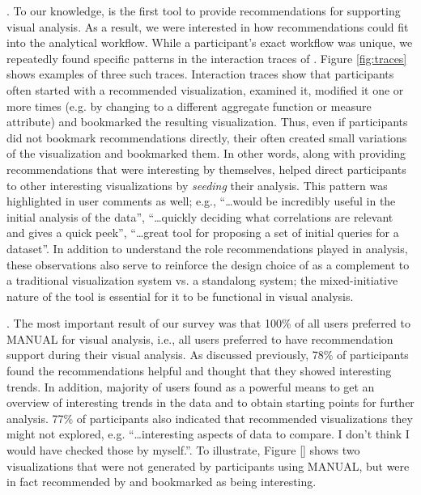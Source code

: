 . 
To our knowledge, \SeeDB is the first tool to provide recommendations for supporting visual
analysis.
As a result, we were interested in how recommendations could fit into the analytical workflow.
While a participant's exact workflow was unique, we repeatedly found specific patterns in the
interaction traces of \SeeDB.
Figure \ref{fig:traces} shows examples of three such traces.
Interaction traces show that participants often started with a recommended visualization, 
examined it, modified it one or more times (e.g. by changing to a different aggregate function 
or measure attribute) and bookmarked the resulting visualization.
Thus, even if participants did not bookmark recommendations directly, their often created
small variations of the visualization and bookmarked them.
In other words, along with providing recommendations that were interesting by themselves, \SeeDB
helped direct participants to other interesting visualizations by {\em seeding} their analysis.
This pattern was highlighted in user comments as well; e.g.,
``\ldots would be incredibly useful in the initial analysis of the data'', 
``\ldots quickly deciding what correlations are relevant and gives a quick peek'',
``\ldots great tool for proposing a set of initial queries for a dataset''.
In addition to understand the role recommendations played in analysis, these observations 
also serve to reinforce the design choice of \SeeDB as a complement to a traditional
visualization system vs. a standalong system; the mixed-initiative nature of the tool 
is essential for it to be functional in visual analysis.

. 
The most important result of our survey was that 100\% of all users preferred \SeeDB to MANUAL for
visual analysis, i.e., all users preferred to have recommendation support during their visual analysis.
As discussed previously, 78\% of participants found the recommendations helpful and thought that they
showed interesting trends.
In addition, majority of users found \SeeDB as a powerful means to get an overview of interesting trends
in the data and to obtain starting points for further analysis.
77\% of participants also indicated that \SeeDB recommended visualizations they might not explored, e.g.
``\ldots interesting aspects of data to compare. I don't think I would have checked those by myself.''.
To illustrate, Figure \ref{} shows two visualizations that were not generated by participants using MANUAL,
but were in fact recommended by \SeeDB and bookmarked as being interesting.


